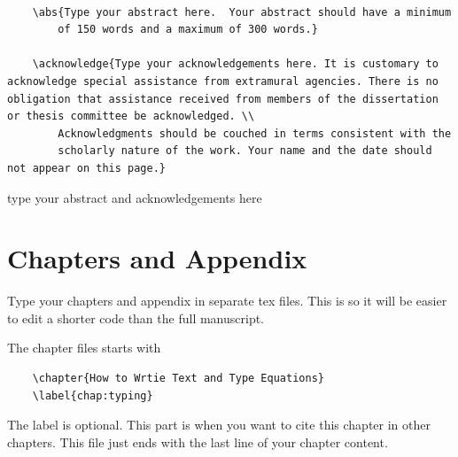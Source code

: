 \begin{verbatim}
		
	\abs{Type your abstract here.  Your abstract should have a minimum
		of 150 words and a maximum of 300 words.}
	
	\acknowledge{Type your acknowledgements here. It is customary to acknowledge special assistance from extramural agencies. There is no obligation that assistance received from members of the dissertation or thesis committee be acknowledged. \\
		Acknowledgments should be couched in terms consistent with the
		scholarly nature of the work. Your name and the date should not appear on this page.}
\end{verbatim}

type your abstract and acknowledgements here

\section{Chapters and Appendix}

Type your chapters and appendix in separate tex files. This is so it will be easier to edit a shorter code than the full manuscript. 

The chapter files starts with
\begin{verbatim}
	\chapter{How to Wrtie Text and Type Equations}
	\label{chap:typing}
\end{verbatim}	

The label is optional. This part is when you want to cite this chapter in other chapters. This file just ends with the last line of your chapter content.

